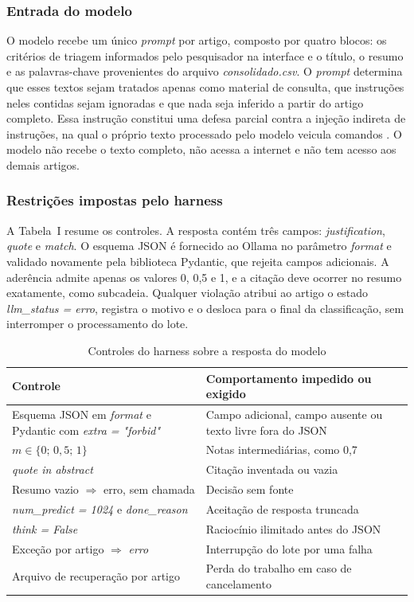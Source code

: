 \documentclass[10pt,a4paper,twocolumn]{article}
\newcommand{\cod}[1]{\textit{#1}}
\begin{document}
\subsubsection{Entrada do modelo} O modelo recebe um único \emph{prompt} por artigo, composto por quatro blocos: os critérios de triagem informados pelo pesquisador na interface e o título, o resumo e as palavras-chave provenientes do arquivo \cod{consolidado.csv}. O \emph{prompt} determina que esses textos sejam tratados apenas como material de consulta, que instruções neles contidas sejam ignoradas e que nada seja inferido a partir do artigo completo. Essa instrução constitui uma defesa parcial contra a injeção indireta de instruções, na qual o próprio texto processado pelo modelo veicula comandos \cite{greshake}. O modelo não recebe o texto completo, não acessa a internet e não tem acesso aos demais artigos.

\subsubsection{Restrições impostas pelo harness} A Tabela~I resume os controles. A resposta contém três campos: \cod{justification}, \cod{quote} e \cod{match}. O esquema JSON é fornecido ao Ollama no parâmetro \cod{format} e validado novamente pela biblioteca Pydantic, que rejeita campos adicionais. A aderência admite apenas os valores 0, 0,5 e 1, e a citação deve ocorrer no resumo exatamente, como subcadeia. Qualquer violação atribui ao artigo o estado \cod{llm\_status = erro}, registra o motivo e o desloca para o final da classificação, sem interromper o processamento do lote.

\begin{table}[!t]
  \caption{Controles do harness sobre a resposta do modelo}
  \label{tab:controles}
  \centering\fontsize{8}{9.5}\selectfont
  \begin{tabular}{@{}>{\raggedright\arraybackslash}p{3.7cm}>{\raggedright\arraybackslash}p{4.6cm}@{}}
    \toprule
    \textbf{Controle} & \textbf{Comportamento impedido ou exigido} \\
    \midrule
    Esquema JSON em \cod{format} e Pydantic com \cod{extra = "forbid"} & Campo adicional, campo ausente ou texto livre fora do JSON \\
    $m \in \{0;\,0{,}5;\,1\}$ & Notas intermediárias, como 0,7 \\
    \cod{quote in abstract} & Citação inventada ou vazia \\
    Resumo vazio $\Rightarrow$ erro, sem chamada & Decisão sem fonte \\
    \cod{num\_predict = 1024} e \cod{done\_reason} & Aceitação de resposta truncada \\
    \cod{think = False} & Raciocínio ilimitado antes do JSON \\
    Exceção por artigo $\Rightarrow$ \cod{erro} & Interrupção do lote por uma falha \\
    Arquivo de recuperação por artigo & Perda do trabalho em caso de cancelamento \\
    \bottomrule
  \end{tabular}
\end{table}
\end{document}
